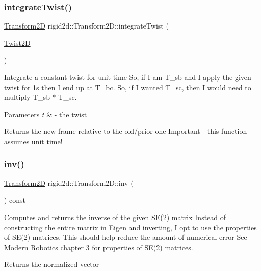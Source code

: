 \subsubsection{\texorpdfstring{integrate\+Twist()}{integrateTwist()}}
{\footnotesize\ttfamily \hyperlink{classrigid2d_1_1Transform2D}{Transform2D} rigid2d\+::\+Transform2\+D\+::integrate\+Twist (\begin{DoxyParamCaption}\item[{\hyperlink{classrigid2d_1_1Twist2D}{Twist2D}}]{ }\end{DoxyParamCaption})}



Integrate a constant twist for unit time So, if I am T\+\_\+sb and I apply the given twist for 1s then I end up at T\+\_\+bc. So, if I wanted T\+\_\+sc, then I would need to multiply T\+\_\+sb $\ast$ T\+\_\+sc. 


\begin{DoxyParams}{Parameters}
{\em t} & -\/ the twist \\
\hline
\end{DoxyParams}
\begin{DoxyReturn}{Returns}
the new frame relative to the old/prior one Important -\/ this function assumes unit time! 
\end{DoxyReturn}
\mbox{\label{classrigid2d_1_1Transform2D_a921bb5138fd83e48aaf75349dfd51653}} 
\subsubsection{\texorpdfstring{inv()}{inv()}}
{\footnotesize\ttfamily \hyperlink{classrigid2d_1_1Transform2D}{Transform2D} rigid2d\+::\+Transform2\+D\+::inv (\begin{DoxyParamCaption}{ }\end{DoxyParamCaption}) const}



Computes and returns the inverse of the given S\+E(2) matrix Instead of constructing the entire matrix in Eigen and inverting, I opt to use the properties of S\+E(2) matrices. This should help reduce the amount of numerical error See Modern Robotics chapter 3 for properties of S\+E(2) matrices. 

\begin{DoxyReturn}{Returns}
the normalized vector 
\end{DoxyReturn}
\mbox{\label{classrigid2d_1_1Transform2D_aab68d8df21419767d4291e226e0a3481}} 
